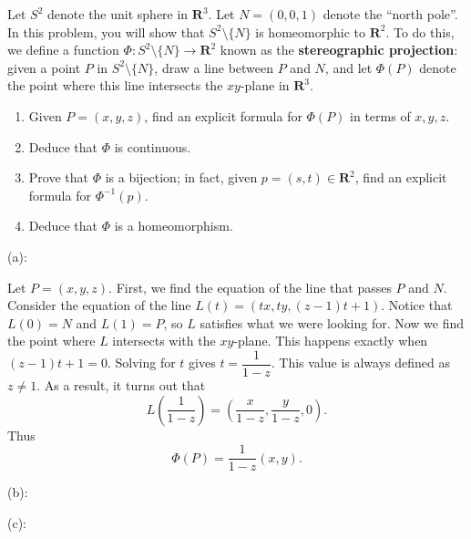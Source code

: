 \documentclass{article}
\newcommand{\R}{\mathbf{R}}
\theoremstyle{plain} %
\numberwithin{thm}{section} %
\theoremstyle{definition}
\begin{document}
    \begin{question}{23}
        Let $S^2$ denote the unit sphere in $\R^3$. Let $N=(0,0,1)$ denote the ``north pole''. In this problem, you will show that $S^2\setminus \{N\}$ is homeomorphic to $\R^2$. To do this, we define a function $\Phi:S^2\setminus \{N\}\rightarrow \R^2$ known as the \textbf{stereographic projection}: given a point $P$ in $S^2\setminus \{N\}$, draw a line between $P$ and $N$, and let $\Phi(P)$ denote the point where this line intersects the $xy$-plane in $\R^3$.
        \begin{enumerate}[label=(\alph*)]
            \item Given $P=(x,y,z)$, find an explicit formula for $\Phi(P)$ in terms of $x,y,z$.
            \item Deduce that $\Phi$ is continuous.
            \item Prove that $\Phi$ is a bijection; in fact, given $p=(s,t)\in \R^2$, find an explicit formula for $\Phi^{-1}(p)$.
            \item Deduce that $\Phi$ is a homeomorphism.
        \end{enumerate}
        \tcblower
        (a):

        Let \(P=(x,y,z)\). First, we find the equation of the line that passes \(P\) and \(N\). Consider the equation of the line \(L(t) = (tx, ty, (z-1)t + 1)\). Notice that \(L(0) = N\) and \(L(1) = P\), so \(L\) satisfies what we were looking for. Now we find the point where \(L\) intersects with the \(xy\)-plane. This happens exactly when \((z-1)t+1=0\). Solving for \(t\) gives \(t=\dfrac{1}{1-z}\). This value is always defined as \(z\neq 1\). As a result, it turns out that
        \[
            L\left(\frac{1}{1-z}\right) = \left(\frac{x}{1-z}, \frac{y}{1-z}, 0\right) \text{.}
        \]
        Thus
        \[
            \Phi (P) = \frac{1}{1-z}\left(x,y\right) \text{.}
        \]

        (b):

        (c):


\end{question}
\end{document}
